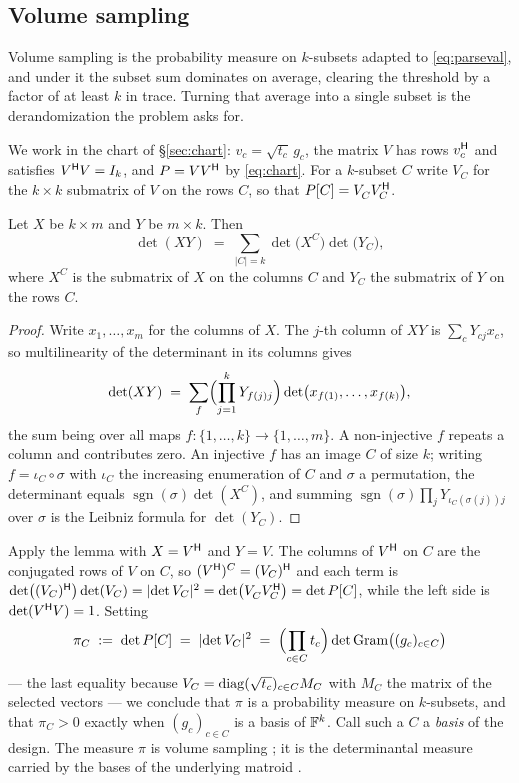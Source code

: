 \subsection{Volume sampling}\label{sec:averaging}

Volume sampling is the probability measure on $k$-subsets adapted to
\eqref{eq:parseval}, and under it the subset sum dominates on average,
clearing the threshold by a factor of at least $k$ in trace.  Turning
that average into a single subset is the derandomization the problem asks
for.

We work
in the chart of \S\ref{sec:chart}: $v_c=\sqrt{t_c}\,g_c$, the matrix $V$
has rows $v_c^{\mathsf{H}}$ and satisfies $V^{\mathsf{H}} V=I_k$, and $P=VV^{\mathsf{H}}$ by
\eqref{eq:chart}.  For a $k$-subset $C$ write $V_C$ for the $k\times k$
submatrix of $V$ on the rows $C$, so that $P[C]=V_C^{\vphantom{\mathsf{H}}}V_C\adj$.

\begin{lemma}\label{lem:cauchybinet}
Let $X$ be $k\times m$ and $Y$ be $m\times k$.  Then
\[
  \det(XY)\;=\;\sum_{\lvert C\rvert=k}
  \det\bigl(X^{C}\bigr)\det\bigl(Y_C\bigr),
\]
where $X^{C}$ is the submatrix of $X$ on the columns $C$ and $Y_C$ the
submatrix of $Y$ on the rows $C$.
\end{lemma}

\begin{proof}
Write $x_1,\dots,x_m$ for the columns of $X$.  The $j$-th column of $XY$
is $\sum_{c}Y_{cj}x_c$, so multilinearity of the determinant in its
columns gives
\[
  \det(XY)\;=\;\sum_{f}\Bigl(\prod_{j=1}^{k}Y_{f(j)j}\Bigr)
  \det\bigl(x_{f(1)},\dots,x_{f(k)}\bigr),
\]
the sum being over all maps $f:\{1,\dots,k\}\to\{1,\dots,m\}$.  A
non-injective $f$ repeats a column and contributes zero.  An injective $f$
has an image $C$ of size $k$; writing $f=\iota_C\circ\sigma$ with
$\iota_C$ the increasing enumeration of $C$ and $\sigma$ a permutation,
the determinant equals $\operatorname{sgn}(\sigma)\det(X^{C})$, and
summing $\operatorname{sgn}(\sigma)\prod_jY_{\iota_C(\sigma(j))j}$ over
$\sigma$ is the Leibniz formula for $\det(Y_C)$.
\end{proof}

Apply the lemma with $X=V^{\mathsf{H}}$ and $Y=V$.  The columns of $V^{\mathsf{H}}$ on $C$
are the conjugated rows of $V$ on $C$, so $(V^{\mathsf{H}})^{C}=(V_C)^{\mathsf{H}}$ and each
term is
$\det\bigl((V_C)\adj\bigr)\det(V_C)=\lvert\det V_C\rvert^{2}
=\det\bigl(V_C^{\vphantom{\mathsf{H}}}V_C\adj\bigr)=\det P[C]$, while the left side
is $\det(V^{\mathsf{H}} V)=1$.  Setting
\begin{equation}\label{eq:dpp}
  \pi_C\;:=\;\det P[C]
  \;=\;\lvert\det V_C\rvert^{2}
  \;=\;\Bigl(\prod_{c\in C}t_c\Bigr)
       \det\operatorname{Gram}\bigl((g_c)_{c\in C}\bigr)
\end{equation}
--- the last equality because $V_C=\operatorname{diag}(\sqrt{t_c})_{c\in C}M_C$ with
$M_C$ the matrix of the selected vectors --- we conclude that $\pi$ is a
probability measure on $k$-subsets, and that $\pi_C>0$ exactly when
$(g_c)_{c\in C}$ is a basis of $\mathbb{F}^k$.  Call such a $C$ a \emph{basis} of
the design.  The measure $\pi$ is volume sampling \cite{DRVW2006}; it is
the determinantal measure carried by the bases of the underlying matroid
\cite{Lyons2003}.

